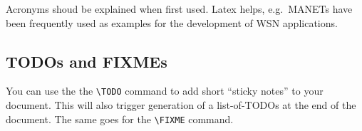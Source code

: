 Acronyms shoud be explained when first used. Latex helps, e.g.\ \acp{MANET} have been frequently used as examples for the development of \ac{WSN} applications.


\subsection{TODOs and FIXMEs}

You can use the the \verb|\TODO| command to add short ``sticky notes'' to your document. 
This will also trigger generation of a list-of-TODOs at the end of the document. 
The same goes for the \verb|\FIXME| command.


